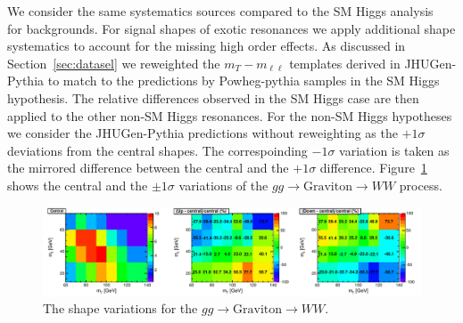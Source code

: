 We consider the same systematics sources compared to the 
SM Higgs analysis~\cite{HWWHCP2012} for backgrounds. 
For signal shapes of exotic resonances we apply additional 
shape systematics to account for the missing high order effects. 
As discussed in Section~\ref{sec:datasel} we reweighted the $m_T-m_{\ell\ell}$ templates 
derived in JHUGen-Pythia to match to the predictions by Powheg-pythia samples in 
the SM Higgs hypothesis. 
The relative differences observed in the SM Higgs case are then 
applied to the other non-SM Higgs resonances. 
For the non-SM Higgs hypotheses we consider the JHUGen-Pythia 
predictions without reweighting as the $+1\sigma$ deviations from the central shapes. 
The correspoinding $-1\sigma$ variation is taken as the mirrored difference between 
the central and the $+1\sigma$ difference. 
Figure~\ref{fig:xwwshapevar} shows the central and the $\pm1\sigma$ variations 
of the $gg\to \text{Graviton}\to WW$ process. 

\begin{figure}[!hbtp]
\centering
\label{subfig:xwwshapevar}
\includegraphics[width=1.15\textwidth]{figures/xww_ggHshapevar.pdf}
\caption{The shape variations for the $gg\to \text{Graviton}\to WW$. 
}
\label{fig:xwwshapevar}
\end{figure}
